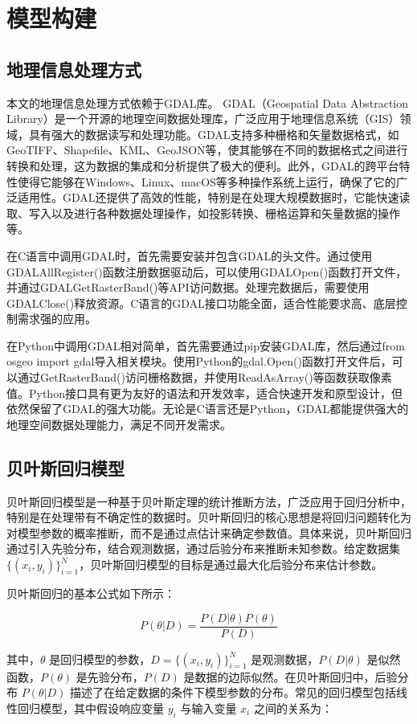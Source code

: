 \documentclass[AutoFakeBold]{LZUThesis-PgD&PhD}
\begin{document}
	\chapter{模型构建}
	
	\section{地理信息处理方式}
	
	本文的地理信息处理方式依赖于GDAL库。
	GDAL（Geospatial Data Abstraction Library）是一个开源的地理空间数据处理库，广泛应用于地理信息系统（GIS）领域，具有强大的数据读写和处理功能。GDAL支持多种栅格和矢量数据格式，如GeoTIFF、Shapefile、KML、GeoJSON等，使其能够在不同的数据格式之间进行转换和处理，这为数据的集成和分析提供了极大的便利。此外，GDAL的跨平台特性使得它能够在Windows、Linux、macOS等多种操作系统上运行，确保了它的广泛适用性。GDAL还提供了高效的性能，特别是在处理大规模数据时，它能快速读取、写入以及进行各种数据处理操作，如投影转换、栅格运算和矢量数据的操作等。
	
	在C语言中调用GDAL时，首先需要安装并包含GDAL的头文件。通过使用GDALAllRegister()函数注册数据驱动后，可以使用GDALOpen()函数打开文件，并通过GDALGetRasterBand()等API访问数据。处理完数据后，需要使用GDALClose()释放资源。C语言的GDAL接口功能全面，适合性能要求高、底层控制需求强的应用。
	
	在Python中调用GDAL相对简单，首先需要通过pip安装GDAL库，然后通过from osgeo import gdal导入相关模块。使用Python的gdal.Open()函数打开文件后，可以通过GetRasterBand()访问栅格数据，并使用ReadAsArray()等函数获取像素值。Python接口具有更为友好的语法和开发效率，适合快速开发和原型设计，但依然保留了GDAL的强大功能。无论是C语言还是Python，GDAL都能提供强大的地理空间数据处理能力，满足不同开发需求。
	\section{贝叶斯回归模型}
	贝叶斯回归模型是一种基于贝叶斯定理的统计推断方法，广泛应用于回归分析中，特别是在处理带有不确定性的数据时。贝叶斯回归的核心思想是将回归问题转化为对模型参数的概率推断，而不是通过点估计来确定参数值。具体来说，贝叶斯回归通过引入先验分布，结合观测数据，通过后验分布来推断未知参数。给定数据集 $\{(x_i, y_i)\}_{i=1}^N$，贝叶斯回归模型的目标是通过最大化后验分布来估计参数。
	
	贝叶斯回归的基本公式如下所示：
	
	\[
	P(\theta | D) = \frac{P(D | \theta) P(\theta)}{P(D)}
	\]
	
	其中，$\theta$ 是回归模型的参数，$D = \{(x_i, y_i)\}_{i=1}^N$ 是观测数据，$P(D | \theta)$ 是似然函数，$P(\theta)$ 是先验分布，$P(D)$ 是数据的边际似然。在贝叶斯回归中，后验分布 $P(\theta | D)$ 描述了在给定数据的条件下模型参数的分布。常见的回归模型包括线性回归模型，其中假设响应变量 $y_i$ 与输入变量 $x_i$ 之间的关系为：
	
\end{document}
